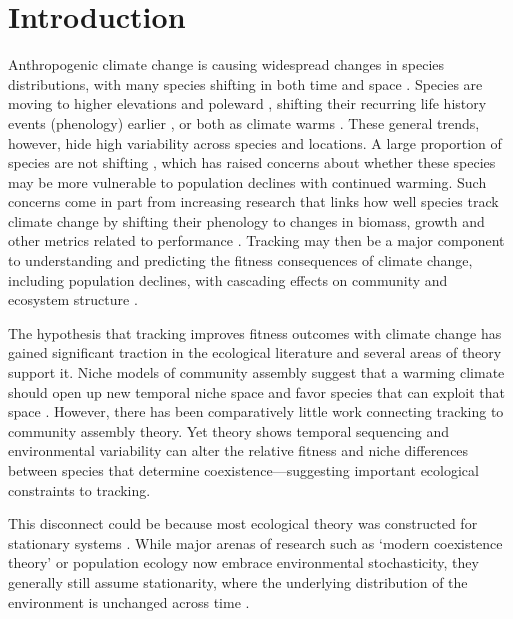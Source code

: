 \documentclass[11pt,letterpaper]{article}
\begin{document}
\section{Introduction}
Anthropogenic climate change is causing widespread changes in species distributions, with many species shifting in both time and space \citep{IPCC:2014sm,ipcc1point5}. Species are moving to higher elevations and poleward \citep{Chen2011}, shifting their recurring life history events (phenology) earlier \citep{Wolkovich:2012n,cohen2018}, or both as climate warms \citep{amano2014,socolar2017}. These general trends, however, hide high variability across species and locations. A large proportion of species are not shifting \citep{Cook:2012pnas,amano2014}, which has raised concerns about whether these species may be more vulnerable to population declines with continued warming. Such concerns come in part from increasing research that links how well species track climate change by shifting their phenology to changes in biomass, growth and other metrics related to performance \citep{Cleland:2012}. Tracking may then be a major component to understanding and predicting the fitness consequences of climate change, including population declines, with cascading effects on community and ecosystem structure \citep{Menzel:2006xn,Parmesan:2006cr}. 

The hypothesis that tracking improves fitness outcomes with climate change has gained significant traction in the ecological literature \citep[e.g.,][]{Cleland:2012} and several areas of theory support it. Niche models of community assembly suggest that a warming climate should open up new temporal niche space and favor species that can exploit that space \citep{gotelli1996,wolkovich:2010fee,Zettlemoyer2019}.  However, there has been comparatively little work connecting tracking to community assembly theory. Yet theory shows temporal sequencing and environmental variability can alter the relative fitness and niche differences between species that determine coexistence---suggesting important ecological constraints to tracking. %

This disconnect could be because most ecological theory was constructed for stationary systems \citep[e.g.,][]{Chesson:1997dz}. While major arenas of research such as `modern coexistence theory' or population ecology now embrace environmental stochasticity, they generally still assume stationarity, where the underlying distribution of the environment is unchanged across time \citep[i.e., constant mean and variance,][]{barabas2018}.
\end{document}
